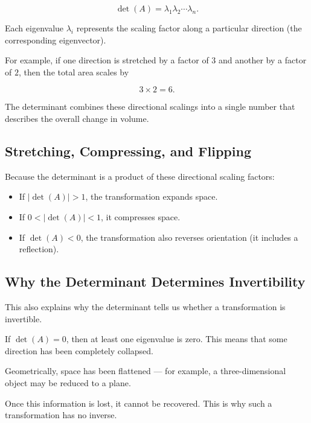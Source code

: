 \documentclass[11pt,openany]{book}
\theoremstyle{definition}
\begin{document}
\[
\det(A) = \lambda_1 \lambda_2 \cdots \lambda_n.
\]

\medskip

Each eigenvalue $\lambda_i$ represents the scaling factor along a particular direction 
(the corresponding eigenvector).

\medskip

For example, if one direction is stretched by a factor of $3$ and another by a factor of $2$, 
then the total area scales by

\[
3 \times 2 = 6.
\]

\medskip

The determinant combines these directional scalings into a single number that describes 
the overall change in volume.

\medskip

\subsection{Stretching, Compressing, and Flipping}

Because the determinant is a product of these directional scaling factors:

\begin{itemize}
  \item If $|\det(A)| > 1$, the transformation expands space.
  \item If $0 < |\det(A)| < 1$, it compresses space.
  \item If $\det(A) < 0$, the transformation also reverses orientation (it includes a reflection).
\end{itemize}

\medskip

\subsection{Why the Determinant Determines Invertibility}

This also explains why the determinant tells us whether a transformation is invertible.

\medskip

If $\det(A) = 0$, then at least one eigenvalue is zero. This means that some direction 
has been completely collapsed.

\medskip

Geometrically, space has been flattened — for example, a three-dimensional object may be 
reduced to a plane.

\medskip

Once this information is lost, it cannot be recovered. This is why such a transformation 
has no inverse.
\end{document}

